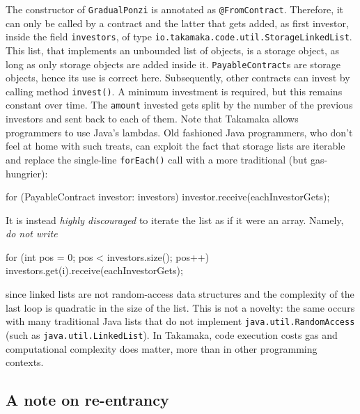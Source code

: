 The constructor of \texttt{GradualPonzi} is annotated as \texttt{@FromContract}. Therefore,
it can only be called by a contract and the latter that gets added, as first investor,
inside the field \texttt{investors}, of type \texttt{io.takamaka.code.util.StorageLinkedList}.
This list, that implements an unbounded list of objects,
is a storage object, as long as only storage objects are
added inside it. \texttt{PayableContract}s are storage objects, hence
its use is correct here.
Subsequently, other contracts can invest by calling method \texttt{invest()}.
A minimum investment is required, but this remains constant over time.
The \texttt{amount} invested gets split by the number of the previous investors
and sent back to each of them. Note that Takamaka allows programmers to use Java's lambdas.
Old fashioned Java programmers, who don't feel at home with such treats,
can exploit the fact that
storage lists are iterable and replace the single-line \texttt{forEach()} call
with a more traditional (but gas-hungrier):
%
\begin{codebox}\begin{javalst}
for (PayableContract investor: investors)
  investor.receive(eachInvestorGets);
\end{javalst}\end{codebox}
%
It is instead \emph{highly discouraged} to iterate the list as if it were an
array. Namely, \emph{do not write}
%
\begin{codebox}\begin{javalst}
for (int pos = 0; pos < investors.size(); pos++)
  investors.get(i).receive(eachInvestorGets);
\end{javalst}\end{codebox}
%
since linked lists are not random-access data structures and the complexity of the
last loop is quadratic in the size of the list. This is not a novelty: the
same occurs with many traditional Java lists that do not implement
\texttt{java.util.RandomAccess} (such as \texttt{java.util.LinkedList}).
In Takamaka, code execution costs gas and
computational complexity does matter, more than in other programming contexts.

\subsection{A note on re-entrancy}\label{subsec:reentrancy}


